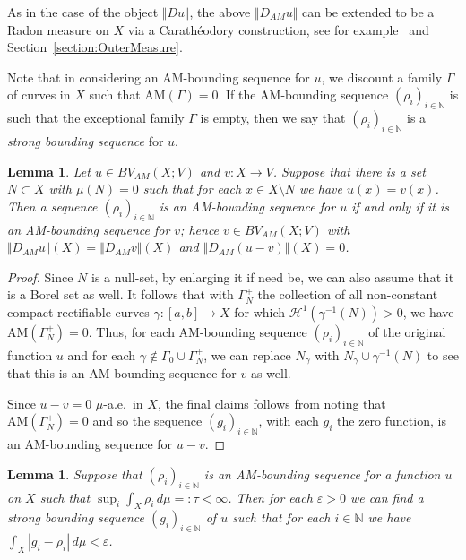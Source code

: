 \documentclass[11pt, letterpaper]{amsart} %
\newcommand*{\N}{{\mathbb N}}
\newcommand*{\eps}{\varepsilon}
\newcommand*{\AM}{\text{AM}}
\numberwithin{equation}{section}
\theoremstyle{plain}
\newtheorem{lemma}[equation]{Lemma}
\theoremstyle{definition}
\begin{document}
{As in the case of the object $\Vert Du\Vert$, the above $\Vert D_{AM}u\Vert$ can be extended to be a Radon measure on $X$
via a Carath\'eodory construction, see for example~\cite{Martio} and Section~\ref{section:OuterMeasure}.


Note that in considering an AM-bounding sequence for $u$, we discount a family $\Gamma$ of curves in $X$ such that
$\AM(\Gamma)=0$. If the AM-bounding sequence $(\rho_i)_{i\in\N}$ is such that the exceptional family $\Gamma$ is 
empty, then we say that $(\rho_i)_{i\in\N}$ is a \emph{strong bounding sequence} for $u$.

\begin{lemma}\label{lem:null-mod}
Let $u\in BV_{AM}(X;V)$ and $v:X\to V$. 
Suppose that there is a set $N\subset X$ with $\mu(N)=0$ such that for
each $x\in X\setminus N$ we have $u(x)=v(x)$. Then a sequence $(\rho_i)_{i\in\N}$ is an AM-bounding sequence for
$u$ if and only if it is an AM-bounding sequence for $v$; hence $v\in BV_{AM}(X;V)$ with
$\Vert D_{AM}u\Vert(X)=\Vert D_{AM}v\Vert(X)$ and $\Vert D_{AM}(u-v)\Vert(X)=0$.
\end{lemma}

\begin{proof}
Since $N$ is a null-set, by enlarging it if need be, we can also assume that it is a Borel set as well. It follows that with
$\Gamma_N^+$ the collection of all non-constant compact rectifiable curves $\gamma:[a,b]\to X$ for which 
$\mathcal{H}^{1}(\gamma^{-1}(N))>0$, we have $\AM(\Gamma_N^+)=0$. Thus, for each AM-bounding sequence
$(\rho_i)_{i\in\N}$ of the original function $u$ and for each $\gamma\not\in\Gamma_0\cup\Gamma_N^+$,
we can replace $N_\gamma$ with $N_\gamma\cup\gamma^{-1}(N)$ to see that this is an AM-bounding sequence for
$v$ as well.

Since $u-v=0$ $\mu$-a.e.~in $X$, the final claims follows from noting that $\AM(\Gamma_N^+)=0$ and so
the sequence $(g_i)_{i\in\N}$, with each $g_i$ the zero function, is an AM-bounding sequence for $u-v$.
\end{proof}

\begin{lemma}\label{rem:AllCurves}
Suppose that $(\rho_i)_{i\in\N}$ is an AM-bounding sequence for a function $u$ on $X$ such that
$\sup_i\int_X\rho_i\, d\mu=:\tau<\infty$. Then for each $\eps>0$ we can find a strong bounding sequence $(g_i)_{i\in\N}$
of $u$ such that for each $i\in\N$ we have $\int_X|g_i-\rho_i|\, d\mu<\eps$.
\end{lemma}

}
\end{document}
